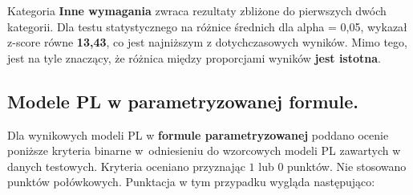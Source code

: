 
Kategoria \textbf{Inne wymagania} zwraca rezultaty zbliżone do pierwszych dwóch kategorii. Dla testu statystycznego na różnice średnich dla alpha = 0,05, wykazał z-score równe \textbf{13,43}, co jest najniższym z dotychczasowych wyników. Mimo tego, jest na tyle znaczący, że różnica między proporcjami wyników \textbf{jest istotna}.

\subsection{Modele PL w parametryzowanej formule.}\label{ch:experiment:parameters}

Dla wynikowych modeli PL w \textbf{formule parametryzowanej} poddano ocenie poniższe kryteria binarne w~odniesieniu do wzorcowych modeli PL zawartych w danych testowych. Kryteria oceniano przyznając $1$ lub $0$ punktów. Nie stosowano punktów połówkowych. Punktacja w tym przypadku wygląda następująco:

